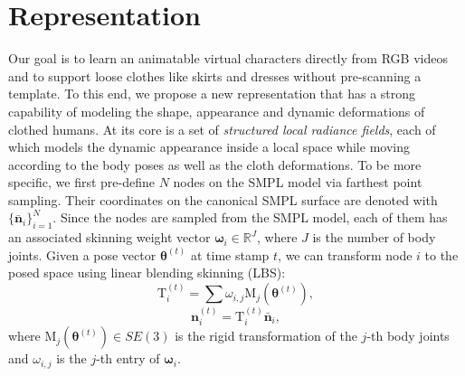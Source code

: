 
\section{Representation}
\label{sec:overview}

Our goal is to learn an animatable virtual characters directly from RGB videos and to support loose clothes like skirts and dresses without pre-scanning a template. To this end, we propose a new representation that has a strong capability of modeling the shape, appearance and dynamic deformations of clothed humans. At its core is a set of \emph{structured local radiance fields}, each of which models the dynamic appearance inside a local space while moving according to the body poses as well as the cloth deformations. 
To be more specific, we first pre-define $N$ nodes on the SMPL model via farthest point sampling. Their coordinates on the canonical SMPL surface are denoted with $\{\bm{\bar{n}}_i\}_{i=1}^N$. Since the nodes are sampled from the SMPL model, each of them has an associated skinning weight vector $\bm{\omega}_i\in\mathbb{R}^J$, where $J$ is the number of body joints. 
Given a pose vector $\bm{\theta}^{(t)}$ at time stamp $t$, we can transform node $i$ to the posed space using linear blending skinning (LBS): 
\begin{equation}
\label{eqn:reprez:lbs}
    \bm{\mathrm{T}}_i^{(t)} = \sum \omega_{i,j} \bm{\mathrm{M}}_j(\bm{\theta}^{(t)}), 
\end{equation}
\begin{equation}
\label{eqn:reprez:skinning}
    \bm{n}_i^{(t)} = \bm{\mathrm{T}}_i^{(t)} \bm{\bar{n}}_i, 
\end{equation}
where $\bm{\mathrm{M}}_j(\bm{\theta}^{(t)}) \in SE(3)$ is the rigid transformation of the $j$-th body joints and $\omega_{i,j}$ is the $j$-th entry of $\bm{\omega}_i$. 


